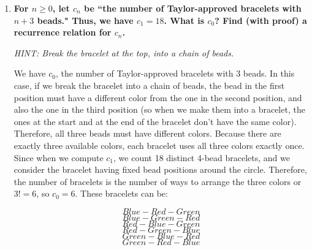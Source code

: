 \documentclass[10pt]{article}
\begin{document}
\begin{enumerate}
\begin{center}
\end{center}


\begin{enumerate}
\item
\textbf{For $n\geq 0$, let $c_n$ be ``the number of Taylor-approved bracelets with $n+3$ beads."  Thus, we have $c_1=18$.  What is $c_0$?  Find (with proof) a recurrence relation for $c_n$.}

{\footnotesize \it HINT: Break the bracelet at the top,  into a chain of beads.}

We have $c_0$, the number of Taylor-approved bracelets with $3$ beads. In this case, if we break the bracelet into a chain of beads, the bead in the first position must have a different color from the one in the second position, and also the one in the third position (so when we make them into a bracelet, the ones at the start and at the end of the bracelet don't have the same color). Therefore, all three beads must have different colors. Because there are exactly three available colors, each bracelet uses all three colors exactly once. Since when we compute $c_1$, we count 18 distinct 4-bead bracelets, and we consider the bracelet having fixed bead positions around the circle. Therefore, the number of bracelets is the number of ways to arrange the three colors or $3!=6$, so $c_0=6$. These bracelets can be:

$$Blue-Red-Green$$
$$Blue-Green-Red$$
$$Red-Blue-Green$$
$$Red-Green-Blue$$
$$Green-Blue-Red$$
$$Green-Red-Blue$$


\end{enumerate}
\end{enumerate}
\end{document}
